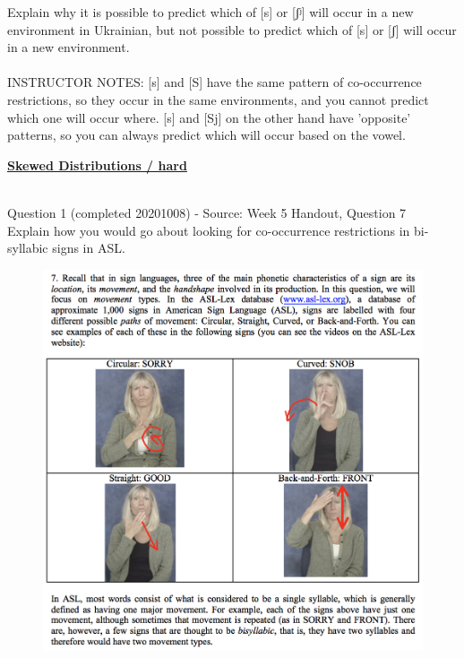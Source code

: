 \documentclass[12pt]{article}
\begin{document}
Explain why it is possible to predict which of [s] or [ʃʲ] will occur in a new environment in Ukrainian, but not possible to predict which of [s] or [ʃ] will occur in a new environment.\\


~\\
INSTRUCTOR NOTES: [s] and [S] have the same pattern of co-occurrence restrictions, so they occur in the same environments, and you cannot predict which one will occur where. [s] and [Sj] on the other hand have 'opposite' patterns, so you can always predict which will occur based on the vowel.


\newpage\textbf{\underline{\huge Skewed Distributions / hard\\}}

~\\

{\large Question 1} (completed 20201008) - Source: Week 5 Handout, Question 7\\

Explain how you would go about looking for co-occurrence restrictions in bi-syllabic signs in ASL.\\

\begin{figure}[H]
\includegraphics{../images/ASL_movement.png}
\end{figure}
\end{document}
